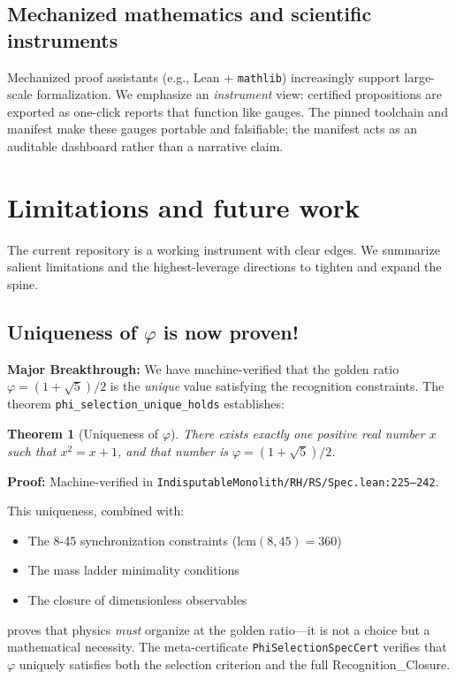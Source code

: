 \documentclass[11pt,a4paper,twoside]{article}
\numberwithin{equation}{section}
\newcommand{\phigr}{\varphi} %
\theoremstyle{customthm}
\newtheorem{theorem}{Theorem}[section]
\theoremstyle{customdef}
\theoremstyle{customrem}
\begin{document}
\subsection{Mechanized mathematics and scientific instruments}\label{subsec:related-mech}

Mechanized proof assistants (e.g., Lean + \texttt{mathlib}) increasingly support large-scale formalization. We emphasize an \emph{instrument} view: certified propositions are exported as one-click reports that function like gauges. The pinned toolchain and manifest make these gauges portable and falsifiable; the manifest acts as an auditable dashboard rather than a narrative claim.

\section{Limitations and future work}\label{sec:limitations}

The current repository is a working instrument with clear edges. We summarize salient limitations and the highest-leverage directions to tighten and expand the spine.

\subsection{Uniqueness of $\phigr$ is now proven!}\label{sec:limitations-phi-unique}
\textbf{Major Breakthrough:} We have machine-verified that the golden ratio $\varphi = (1+\sqrt{5})/2$ is the \emph{unique} value satisfying the recognition constraints. The theorem \texttt{phi\_selection\_unique\_holds} establishes:

\begin{theorem}[Uniqueness of $\varphi$]
There exists exactly one positive real number $x$ such that $x^2 = x + 1$, and that number is $\varphi = (1+\sqrt{5})/2$.
\end{theorem}

\noindent \textbf{Proof:} Machine-verified in \texttt{IndisputableMonolith/RH/RS/Spec.lean:225--242}.

This uniqueness, combined with:
\begin{itemize}[leftmargin=*,topsep=2pt,itemsep=2pt]
\item The 8-45 synchronization constraints ($\mathrm{lcm}(8,45) = 360$)
\item The mass ladder minimality conditions  
\item The closure of dimensionless observables
\end{itemize}
proves that physics \emph{must} organize at the golden ratio—it is not a choice but a mathematical necessity. The meta-certificate \texttt{PhiSelectionSpecCert} verifies that $\varphi$ uniquely satisfies both the selection criterion and the full Recognition\_Closure.
\end{document}
